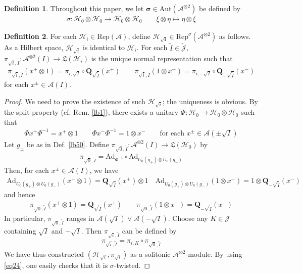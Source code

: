 \documentclass[11pt,b5paper,notitlepage]{article}
\theoremstyle{definition}
\newtheorem{df}{Definition}[section]
\theoremstyle{plain}
\newcommand{\fk}{\mathfrak}
\newcommand{\wtd}{\widetilde}
\newcommand{\Rep}{\mathrm{Rep}}
\newcommand{\Jtd}{\widetilde{\mathcal J}}
\newcommand{\Ad}{\mathrm{Ad}}
\newcommand{\RepA}{\mathrm{Rep}(\mathcal A)}
\newcommand{\mbf}{\mathbf}
\newcommand{\Aut}{\mathrm{Aut}}
\newcommand{\MA}{\mathcal A}
\newcommand{\MH}{\mathcal H}
\newcommand{\MJ}{\mathcal J}
\newcommand{\Maa}{{\mathcal A^{\otimes 2}}}
\numberwithin{equation}{section}
\begin{document}
\begin{df}
Throughout this paper, we let $\pmb\sigma\in\Aut(\Maa)$ be defined by
\begin{align*}
\sigma:\MH_0\otimes\MH_0\rightarrow\MH_0\otimes\MH_0\qquad\xi\otimes\eta\mapsto\eta\otimes\xi
\end{align*} 
\end{df}

\begin{df}\label{lb52}
For each $\MH_i\in\RepA$, define $\pmb{\MH_{\sqrt i}}\in\Rep^\sigma(\Maa)$ as follows. As a Hilbert space, $\MH_{\sqrt i}$ is identical to $\MH_i$. For each $\wtd I\in\Jtd$, $\pi_{\sqrt i,\wtd I}:\Maa(I)\rightarrow\fk L(\MH_i)$ is the unique normal representation such that
\begin{align}\label{eq24}
\pi_{\sqrt i,\wtd I}(x^+\otimes 1)=\pi_{i,\sqrt I}\circ\mbf Q_{\sqrt{\wtd I}}(x^+)\qquad \pi_{\sqrt i,\wtd I}(1\otimes x^-)=\pi_{i,-\sqrt I}\circ\mbf Q_{-\sqrt{\wtd I}}(x^-)
\end{align}
for each $x^\pm\in\MA(I)$.
\end{df}


\begin{proof}
We need to prove the existence of such $\MH_{\sqrt i}$; the uniqueness is obvious. By the split property (cf. Rem. \ref{lb1}), there exists a unitary $\Phi:\MH_0\rightarrow\MH_0\otimes\MH_0$ such that
\begin{align*}
\Phi x^+\Phi^{-1}=x^+\otimes 1\qquad\Phi x^-\Phi^{-1}=1\otimes x^-\qquad \text{for each }x^\pm\in\MA(\pm\sqrt I)
\end{align*}
Let $g_\pm$ be as in Def. \ref{lb50}. Define $\pi_{\sqrt 0,\wtd I}:\Maa(I)\rightarrow\fk L(\MH_0)$ by
\begin{gather*}
\pi_{\sqrt 0,\wtd I}=\Ad_{\Phi^{-1}}\circ\Ad_{U_0(g_+)\otimes U_0(g_-)}
\end{gather*}
Then, for each $x^\pm\in\MA(I)$, we have
\begin{align*}
\Ad_{U_0(g_+)\otimes U_0(g_-)}(x^+\otimes 1)=\mbf Q_{\sqrt{\wtd I}}(x^+)\otimes 1\quad \Ad_{U_0(g_+)\otimes U_0(g_-)}(1\otimes x^-)=1\otimes\mbf Q_{-\sqrt{\wtd I}}(x^-)
\end{align*}
and hence
\begin{align*}
\pi_{\sqrt 0,\wtd I}(x^+\otimes 1)=\mbf Q_{\sqrt{\wtd I}}(x^+)\qquad \pi_{\sqrt 0,\wtd I}(1\otimes x^-)=\mbf Q_{-\sqrt{\wtd I}}(x^-)
\end{align*}
In particular, $\pi_{\sqrt 0,\wtd I}$ ranges in $\MA(\sqrt I)\vee\MA(-\sqrt I)$. Choose any $K\in\MJ$ containing $\sqrt I$ and $-\sqrt I$. Then $\pi_{\sqrt i,\wtd I}$ can be defined by
\begin{align*}
\pi_{\sqrt i,\wtd I}=\pi_{i,K}\circ\pi_{\sqrt 0,\wtd I}
\end{align*}
We have thus constructed $(\MH_{\sqrt i},\pi_{\sqrt i})$ as a solitonic $\Maa$-module. By using \eqref{eq24}, one easily checks that it is $\sigma$-twisted.
\end{proof}
\end{document}

